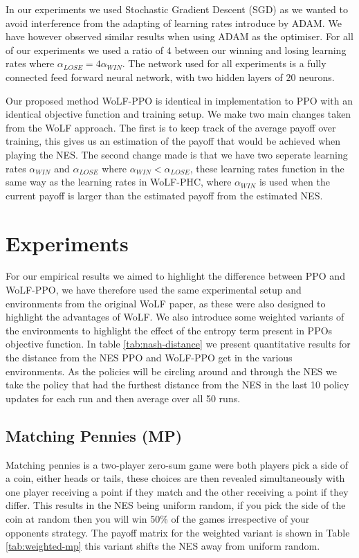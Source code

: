 \documentclass[conference]{IEEEtran}
\newcommand\REVIEW[1]{{\color{blue} #1}}
\begin{document}
In our experiments we used Stochastic Gradient Descent (SGD) as we wanted to avoid interference from the adapting of learning rates introduce by ADAM. We have however observed similar results when using ADAM as the optimiser. For all of our experiments we used a ratio of $4$ between our winning and losing learning rates where $\alpha_{LOSE} = 4\alpha_{WIN}$. The network used for all experiments is a fully connected feed forward neural network, with two hidden layers of $20$ neurons.

\REVIEW{
    Our proposed method WoLF-PPO is identical in implementation to PPO with an identical objective function and training setup. We make two main changes taken from the WoLF approach. The first is to keep track of the average payoff over training, this gives us an estimation of the payoff that would be achieved when playing the NES. The second change made is that we have two seperate learning rates $\alpha_{WIN}$ and $\alpha_{LOSE}$ where $\alpha_{WIN} < \alpha_{LOSE}$, these learning rates function in the same way as the learning rates in WoLF-PHC, where $\alpha_{WIN}$ is used when the current payoff is larger than the estimated payoff from the estimated NES.
}

\section{Experiments}


For our empirical results we aimed to highlight the difference between PPO and WoLF-PPO, we have therefore used the same experimental setup and environments from the original WoLF paper, as these were also designed to highlight the advantages of WoLF\cite{bowling2002multiagent}. We also introduce some weighted variants of the environments to highlight the effect of the entropy term present in PPOs objective function. In table \ref{tab:nash-distance} we present quantitative results for the distance from the NES PPO and WoLF-PPO get in the various environments. As the policies will be circling around and through the NES we take the policy that had the furthest distance from the NES in the last 10 policy updates for each run and then average over all 50 runs.

\subsection{Matching Pennies (MP)}

Matching pennies is a two-player zero-sum game were both players pick a side of a coin, either heads or tails, these choices are then revealed simultaneously with one player receiving a point if they match and the other receiving a point if they differ. This results in the NES being uniform random, if you pick the side of the coin at random then you will win 50\% of the games irrespective of your opponents strategy. The payoff matrix for the weighted variant is shown in Table \ref{tab:weighted-mp} this variant shifts the NES away from uniform random.
\end{document}
